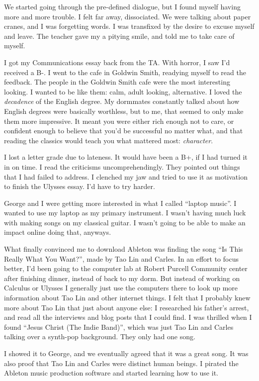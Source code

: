 We started going through the pre-defined dialogue, but I found myself having
more and more trouble.  I felt far away, dissociated.  We were talking about
paper cranes, and I was forgetting words.  I was transfixed by the desire to
excuse myself and leave.  The teacher gave my a pitying smile, and told me to
take care of myself.

I got my Communications essay back from the TA.  With horror, I saw I'd received
a B-.  I went to the cafe in Goldwin Smith, readying myself to read the
feedback.  The people in the Goldwin Smith cafe were the most interesting
looking.  I wanted to be like them: calm, adult looking, alternative.  I loved
the \textit{decadence} of the English degree.  My dormmates constantly talked
about how English degrees were basically worthless, but to me, that seemed to
only make them more impressive.  It meant you were either rich enough not to
care, or confident enough to believe that you'd be successful no matter what,
and that reading the classics would teach you what mattered most:
\textit{character}.

I lost a letter grade due to lateness.  It would have been a B+, if I had turned
it in on time.  I read the criticisms uncomprehendingly.  They pointed out
things that I had failed to address.  I clenched my jaw and tried to use it as
motivation to finish the Ulysses essay.  I'd have to try harder.

George and I were getting more interested in what I called ``laptop music''.  I
wanted to use my laptop as my primary instrument.  I wasn't having much luck
with making songs on my classical guitar.  I wasn't going to be able to make an
impact online doing that, anyways.  

What finally convinced me to download Ableton was finding the song ``Is This
Really What You Want?'', made by Tao Lin and Carles.  In an effort to focus
better, I'd been going to the computer lab at Robert Purcell Community center
after finishing dinner, instead of back to my dorm.  But instead of working on
Calculus or Ulysses I generally just use the computers there to look up more
information about Tao Lin and other internet things.  I felt that I probably
knew more about Tao Lin that just about anyone else: I researched his father's
arrest, and read all the interviews and blog posts that I could find.  I was
thrilled when I found ``Jesus Christ (The Indie Band)'', which was just Tao Lin
and Carles talking over a synth-pop background.  They only had one song.  

I showed it to George, and we eventually agreed that it was a great song. It was
also proof that  Tao Lin and Carles were distinct human beings.  I pirated the
Ableton music production software and started learning how to use it.  

